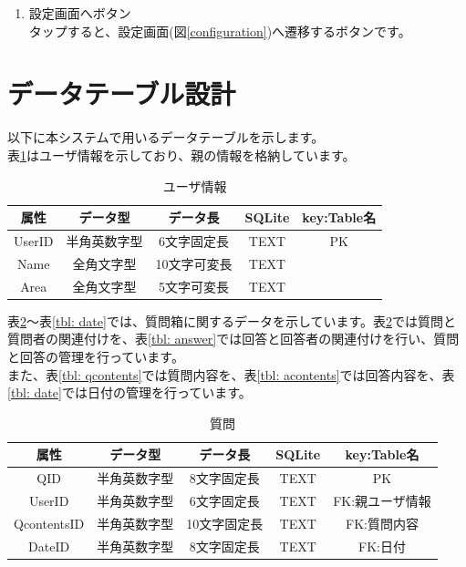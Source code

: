 \documentclass[a4j]{jarticle}
\begin{document}
\begin{enumerate}
  \renewcommand{\labelenumi}{\textcircled{\scriptsize \theenumi}}
\item 設定画面へボタン\\
  タップすると、設定画面(図\ref{configuration})へ遷移するボタンです。
\end{enumerate}

\newpage
\section{データテーブル設計}

以下に本システムで用いるデータテーブルを示します。\\
表\ref{tbl: user}はユーザ情報を示しており、親の情報を格納しています。\\

\begin{table}[H]
    \caption{ユーザ情報}
    \label{tbl: user}
    \begin{center}
        \begin{tabular}{|c|c|c|c|c|} \hline
            属性 & データ型 & データ長 & SQLite & key:Table名\\ \hline \hline
            UserID & 半角英数字型 & 6文字固定長 & TEXT & PK\\ \hline
            Name & 全角文字型 & 10文字可変長 & TEXT & \\ \hline
            Area & 全角文字型 & 5文字可変長 & TEXT & \\ \hline
        \end{tabular}
    \end{center}
\end{table}


表\ref{tbl: question}～表\ref{tbl: date}では、質問箱に関するデータを示しています。表\ref{tbl: question}では質問と質問者の関連付けを、表\ref{tbl: answer}では回答と回答者の関連付けを行い、質問と回答の管理を行っています。\\
また、表\ref{tbl: qcontents}では質問内容を、表\ref{tbl: acontents}では回答内容を、表\ref{tbl: date}では日付の管理を行っています。\\
\begin{table}[H]
    \caption{質問}
    \label{tbl: question}
    \begin{center}
        \begin{tabular}{|c|c|c|c|c|} \hline
            属性 & データ型 & データ長 & SQLite & key:Table名\\ \hline \hline
            QID & 半角英数字型 & 8文字固定長 & TEXT & PK\\ \hline
            UserID & 半角英数字型 & 6文字固定長 & TEXT & FK:親ユーザ情報\\ \hline
            QcontentsID & 半角英数字型 & 10文字固定長 & TEXT & FK:質問内容\\ \hline
            DateID & 半角英数字型 & 8文字固定長 & TEXT & FK:日付\\ \hline
        \end{tabular}
    \end{center}
\end{table}
\end{document}
